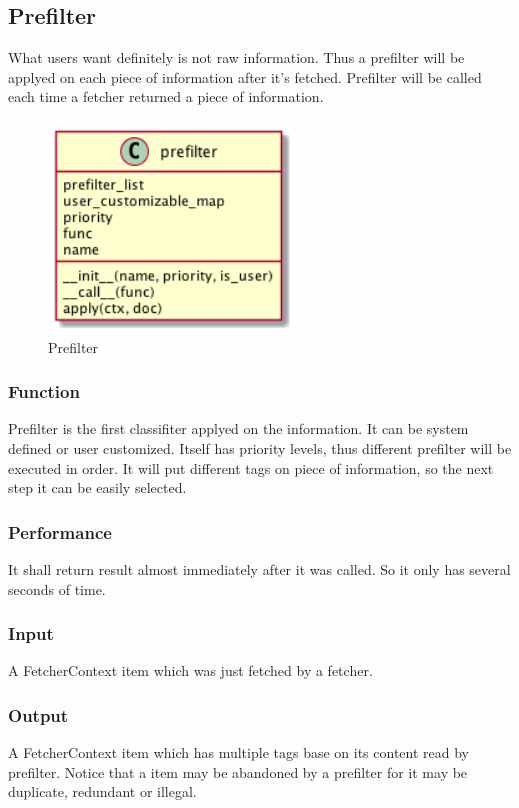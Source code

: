 
\subsection{Prefilter}
  What users want definitely is not raw information. Thus a prefilter will be applyed on each piece of information after it's fetched.
  Prefilter will be called each time a fetcher returned a piece of information.
  \begin{figure}[H]
    \centering
    \includegraphics[width=0.6\textwidth]{img/prefilter.png}
    \caption{Prefilter\label{fig:prefilter}}
  \end{figure}

  \subsubsection{Function}
    Prefilter is the first classifiter applyed on the information. It can be system defined or user customized.
    Itself has priority levels, thus different prefilter will be executed in order.
    It will put different tags on piece of information, so the next step it can be easily selected.

  \subsubsection{Performance}
    It shall return result almost immediately after it was called. So it only has several seconds of time.

  \subsubsection{Input}
    A FetcherContext item which was just fetched by a fetcher.

  \subsubsection{Output}
    A FetcherContext item which has multiple tags base on its content read by prefilter.
    Notice that a item may be abandoned by a prefilter for it may be duplicate, redundant or illegal.

